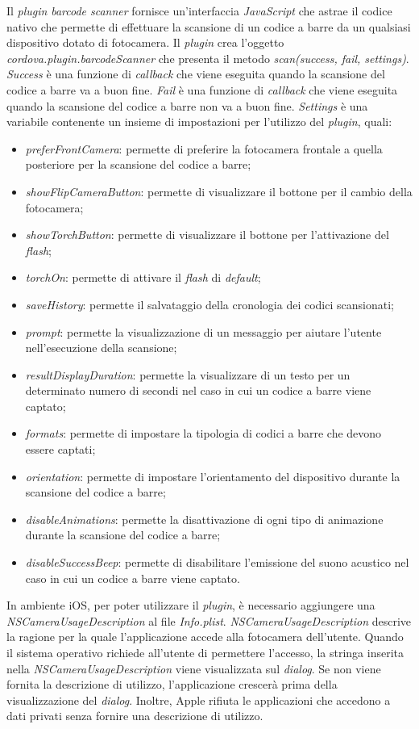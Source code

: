 Il \textit{plugin} \textit{barcode scanner} fornisce un'interfaccia \textit{JavaScript} che astrae il codice nativo che permette di effettuare la scansione di un codice a barre da un qualsiasi dispositivo dotato di fotocamera. Il \textit{plugin} crea l'oggetto \textit{cordova.plugin.barcodeScanner} che presenta il metodo \textit{scan(success, fail, settings)}. \textit{Success} è una funzione di \textit{callback} che viene eseguita quando la scansione del codice a barre va a buon fine. \textit{Fail} è una funzione di \textit{callback} che viene eseguita quando la scansione del codice a barre non va a buon fine. \textit{Settings} è una variabile contenente un insieme di impostazioni per l'utilizzo del \textit{plugin}, quali:
\begin{itemize}
	\item \textit{preferFrontCamera}: permette di preferire la fotocamera frontale a quella posteriore per la scansione del codice a barre;
	\item \textit{showFlipCameraButton}: permette di visualizzare il bottone per il cambio della fotocamera;
	\item \textit{showTorchButton}: permette di visualizzare il bottone per l'attivazione del \textit{flash};
	\item \textit{torchOn}: permette di attivare il \textit{flash} di \textit{default};
	\item \textit{saveHistory}: permette il salvataggio della cronologia dei codici scansionati;
	\item \textit{prompt}: permette la visualizzazione di un messaggio per aiutare l'utente nell'esecuzione della scansione;
	\item \textit{resultDisplayDuration}: permette la visualizzare di un testo per un determinato numero di secondi nel caso in cui un codice a barre viene captato;
	\item \textit{formats}: permette di impostare la tipologia di codici a barre che devono essere captati;
	\item \textit{orientation}: permette di impostare l'orientamento del dispositivo durante la scansione del codice a barre;
	\item \textit{disableAnimations}: permette la disattivazione di ogni tipo di animazione durante la scansione del codice a barre;
	\item \textit{disableSuccessBeep}: permette di disabilitare l'emissione del suono acustico nel caso in cui un codice a barre viene captato.
\end{itemize}
In ambiente iOS, per poter utilizzare il \textit{plugin}, è necessario aggiungere una \textit{NSCameraUsageDescription} al file \textit{Info.plist}. \textit{NSCameraUsageDescription} descrive la ragione per la quale l'applicazione accede alla fotocamera dell'utente. Quando il sistema operativo richiede all'utente di permettere l'accesso, la stringa inserita nella \textit{NSCameraUsageDescription} viene visualizzata sul \textit{dialog}. Se non viene fornita la descrizione di utilizzo, l'applicazione crescerà prima della visualizzazione del \textit{dialog}. Inoltre, Apple rifiuta le applicazioni che accedono a dati privati senza fornire una descrizione di utilizzo. 

